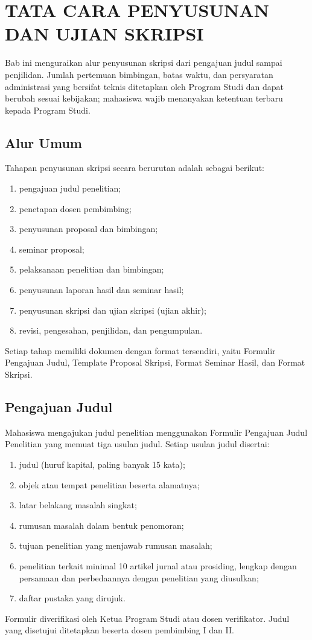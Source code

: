 \chapter{TATA CARA PENYUSUNAN DAN UJIAN SKRIPSI}

Bab ini menguraikan alur penyusunan skripsi dari pengajuan judul sampai penjilidan. Jumlah pertemuan bimbingan, batas waktu, dan persyaratan administrasi yang bersifat teknis ditetapkan oleh Program Studi dan dapat berubah sesuai kebijakan; mahasiswa wajib menanyakan ketentuan terbaru kepada Program Studi.

\section{Alur Umum}
Tahapan penyusunan skripsi secara berurutan adalah sebagai berikut:
\begin{enumerate}
\item pengajuan judul penelitian;
\item penetapan dosen pembimbing;
\item penyusunan proposal dan bimbingan;
\item seminar proposal;
\item pelaksanaan penelitian dan bimbingan;
\item penyusunan laporan hasil dan seminar hasil;
\item penyusunan skripsi dan ujian skripsi (ujian akhir);
\item revisi, pengesahan, penjilidan, dan pengumpulan.
\end{enumerate}
Setiap tahap memiliki dokumen dengan format tersendiri, yaitu Formulir Pengajuan Judul, Template Proposal Skripsi, Format Seminar Hasil, dan Format Skripsi.

\section{Pengajuan Judul}
Mahasiswa mengajukan judul penelitian menggunakan Formulir Pengajuan Judul Penelitian yang memuat tiga usulan judul. Setiap usulan judul disertai:
\begin{enumerate}
\item judul (huruf kapital, paling banyak 15 kata);
\item objek atau tempat penelitian beserta alamatnya;
\item latar belakang masalah singkat;
\item rumusan masalah dalam bentuk penomoran;
\item tujuan penelitian yang menjawab rumusan masalah;
\item penelitian terkait minimal 10 artikel jurnal atau prosiding, lengkap dengan persamaan dan perbedaannya dengan penelitian yang diusulkan;
\item daftar pustaka yang dirujuk.
\end{enumerate}
Formulir diverifikasi oleh Ketua Program Studi atau dosen verifikator. Judul yang disetujui ditetapkan beserta dosen pembimbing I dan II.

